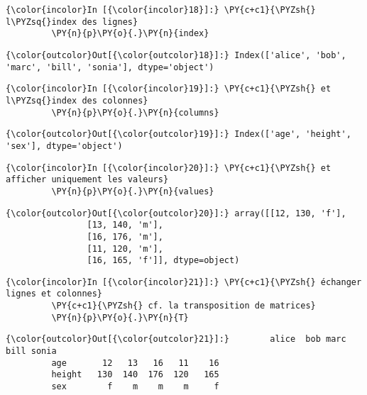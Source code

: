     \begin{Verbatim}[commandchars=\\\{\}]
{\color{incolor}In [{\color{incolor}18}]:} \PY{c+c1}{\PYZsh{} l\PYZsq{}index des lignes}
         \PY{n}{p}\PY{o}{.}\PY{n}{index}
\end{Verbatim}


\begin{Verbatim}[commandchars=\\\{\}]
{\color{outcolor}Out[{\color{outcolor}18}]:} Index(['alice', 'bob', 'marc', 'bill', 'sonia'], dtype='object')
\end{Verbatim}
            
    \begin{Verbatim}[commandchars=\\\{\}]
{\color{incolor}In [{\color{incolor}19}]:} \PY{c+c1}{\PYZsh{} et l\PYZsq{}index des colonnes}
         \PY{n}{p}\PY{o}{.}\PY{n}{columns}
\end{Verbatim}


\begin{Verbatim}[commandchars=\\\{\}]
{\color{outcolor}Out[{\color{outcolor}19}]:} Index(['age', 'height', 'sex'], dtype='object')
\end{Verbatim}
            
    \begin{Verbatim}[commandchars=\\\{\}]
{\color{incolor}In [{\color{incolor}20}]:} \PY{c+c1}{\PYZsh{} et afficher uniquement les valeurs}
         \PY{n}{p}\PY{o}{.}\PY{n}{values}
\end{Verbatim}


\begin{Verbatim}[commandchars=\\\{\}]
{\color{outcolor}Out[{\color{outcolor}20}]:} array([[12, 130, 'f'],
                [13, 140, 'm'],
                [16, 176, 'm'],
                [11, 120, 'm'],
                [16, 165, 'f']], dtype=object)
\end{Verbatim}
            
    \begin{Verbatim}[commandchars=\\\{\}]
{\color{incolor}In [{\color{incolor}21}]:} \PY{c+c1}{\PYZsh{} échanger lignes et colonnes}
         \PY{c+c1}{\PYZsh{} cf. la transposition de matrices}
         \PY{n}{p}\PY{o}{.}\PY{n}{T}
\end{Verbatim}


\begin{Verbatim}[commandchars=\\\{\}]
{\color{outcolor}Out[{\color{outcolor}21}]:}        alice  bob marc bill sonia
         age       12   13   16   11    16
         height   130  140  176  120   165
         sex        f    m    m    m     f
\end{Verbatim}
            
